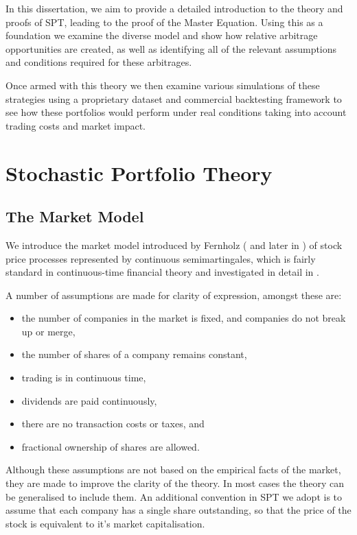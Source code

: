 \documentclass[british]{amsart} \usepackage{lmodern}
\numberwithin{equation}{section} \numberwithin{figure}{section}
\theoremstyle{plain} \newtheorem{thm}{\protect\theoremname}[section]
\theoremstyle{definition} \newtheorem{defn}[thm]{\protect\definitionname}
\theoremstyle{plain} \newtheorem{assumption}[thm]{\protect\assumptionname}
\theoremstyle{plain} \newtheorem{lem}[thm]{\protect\lemmaname}
\theoremstyle{plain} \newtheorem{prop}[thm]{\protect\propositionname}
\theoremstyle{remark} \newtheorem{rem}[thm]{\protect\remarkname}
\theoremstyle{plain} \newtheorem{cor}[thm]{\protect\corollaryname}
\begin{document}
In this dissertation, we aim to provide a detailed introduction to the theory
and proofs of SPT, leading to the proof of the Master Equation. Using this as a
foundation we examine the diverse model and show how relative arbitrage
opportunities are created, as well as identifying all of the relevant
assumptions and conditions required for these arbitrages.

Once armed with this theory we then examine various simulations of these
strategies using a proprietary dataset and commercial backtesting framework to
see how these portfolios would perform under real conditions taking into account
trading costs and market impact.


\section{Stochastic Portfolio Theory}


\subsection{The Market Model}

We introduce the market model introduced by Fernholz (\cite{fernholz1999pgf} and
later in \cite{fernholz2009}) of stock price processes represented by continuous
semimartingales, which is fairly standard in continuous-time financial theory
and investigated in detail in \cite{karatzas1998}.

A number of assumptions are made for clarity of expression, amongst these are:

\begin{itemize}
  \item the number of companies in the market is fixed, and companies do not 
        break up or merge,
  \item the number of shares of a company remains constant,
  \item trading is in continuous time,
  \item dividends are paid continuously,
  \item there are no transaction costs or taxes, and
  \item fractional ownership of shares are allowed.
\end{itemize}

Although these assumptions are not based on the empirical facts of the market,
they are made to improve the clarity of the theory. In most cases the theory can
be generalised to include them. An additional convention in SPT we adopt is to
assume that each company has a single share outstanding, so that the price of
the stock is equivalent to it's market capitalisation.
\end{document}
